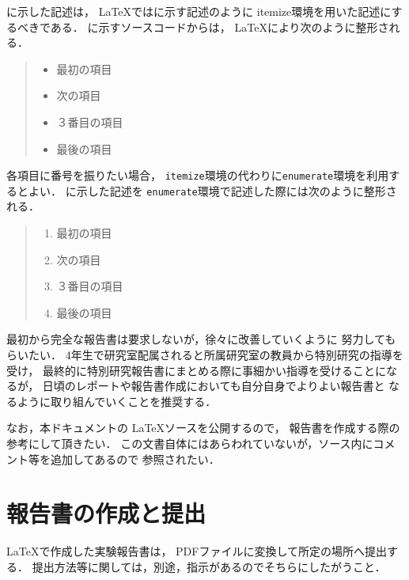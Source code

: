 \documentclass{jarticle}[11pt]
\newcommand{\figref}[1]{\makebox{図~\ref{#1}}}
\begin{document}
\figref{fig:verbatim環境による列挙の記述例}に示した記述は，
\LaTeX では\figref{fig:itemize環境による列挙の記述例}に示す記述のように
itemize環境を用いた記述にするべきである．
\figref{fig:itemize環境による列挙の記述例}に示すソースコードからは，
\LaTeX により次のように整形される．
\begin{quote}
\begin{itemize}
  \item 最初の項目
  \item 次の項目
  \item ３番目の項目
  \item 最後の項目
\end{itemize}
\end{quote}

各項目に番号を振りたい場合，
\verb|itemize|環境の代わりに\verb|enumerate|環境を利用するとよい．
\figref{fig:verbatim環境による列挙の記述例}に示した記述を
\verb|enumerate|環境で記述した際には次のように整形される．
\begin{quote}
\begin{enumerate}
  \item 最初の項目
  \item 次の項目
  \item ３番目の項目
  \item 最後の項目
\end{enumerate}
\end{quote}

最初から完全な報告書は要求しないが，徐々に改善していくように
努力してもらいたい．
4年生で研究室配属されると所属研究室の教員から特別研究の指導を受け，
最終的に特別研究報告書にまとめる際に事細かい指導を受けることになるが，
日頃のレポートや報告書作成においても自分自身でよりよい報告書と
なるように取り組んでいくことを推奨する．

なお，本ドキュメントの \LaTeX ソースを公開するので，
報告書を作成する際の参考にして頂きたい．
この文書自体にはあらわれていないが，ソース内にコメント等を追加してあるので
参照されたい．


\section{報告書の作成と提出}
\label{sec:報告書の作成と提出}
\LaTeX で作成した実験報告書は，
PDFファイルに変換して所定の場所へ提出する．
提出方法等に関しては，別途，指示があるのでそちらにしたがうこと．
\end{document}
